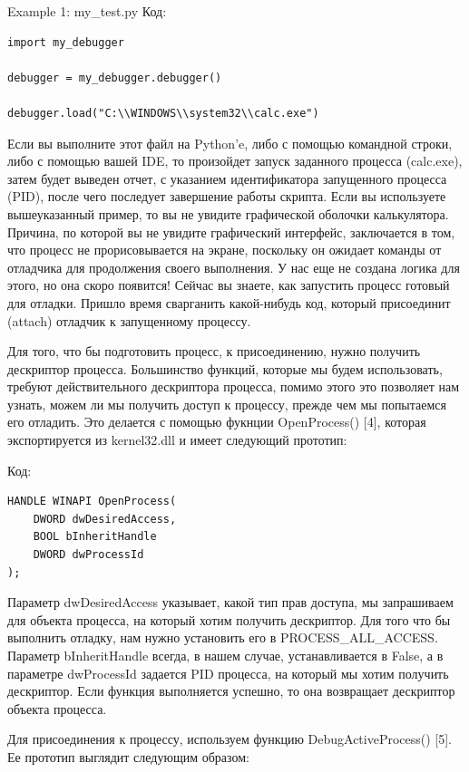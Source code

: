 \documentclass[12pt, a4paper, oneside]{book}
\begin{document}
Example 1: my\_test.py
Код:
\begin{verbatim}
import my_debugger

debugger = my_debugger.debugger()

debugger.load("C:\\WINDOWS\\system32\\calc.exe")
\end{verbatim}

Если вы выполните этот файл на Python’e, либо с помощью командной строки, либо с помощью вашей IDE, то произойдет запуск заданного процесса (calc.exe), затем будет выведен отчет, с указанием идентификатора запущенного процесса (PID), после чего последует завершение работы скрипта. Если вы используете вышеуказанный пример, то вы не увидите графической оболочки калькулятора. Причина, по которой вы не увидите графический интерфейс, заключается в том, что процесс не прорисовывается на экране, поскольку он ожидает команды от отладчика для продолжения своего выполнения. У нас еще не создана логика для этого, но она скоро появится! Сейчас вы знаете, как запустить процесс готовый для отладки. Пришло время сварганить какой-нибудь код, который присоединит (attach) отладчик к запущенному процессу.

Для того, что бы подготовить процесс, к присоединению, нужно получить дескриптор процесса. Большинство функций, которые мы будем использовать, требуют действительного дескриптора процесса, помимо этого это позволяет нам узнать, можем ли мы получить доступ к процессу, прежде чем мы попытаемся его отладить. Это делается с помощью фукнции OpenProcess() [4], которая экспортируется из kernel32.dll и имеет следующий прототип:

Код:
\begin{verbatim}
HANDLE WINAPI OpenProcess(
    DWORD dwDesiredAccess,
    BOOL bInheritHandle
    DWORD dwProcessId
);
\end{verbatim}

Параметр dwDesiredAccess указывает, какой тип прав доступа, мы запрашиваем для объекта процесса, на который хотим получить дескриптор. Для того что бы выполнить отладку, нам нужно установить его в PROCESS\_ALL\_ACCESS. Параметр bInheritHandle всегда, в нашем случае, устанавливается в False, а в параметре dwProcessId задается PID процесса, на который мы хотим получить дескриптор. Если функция выполняется успешно, то она возвращает дескриптор объекта процесса.

Для присоединения к процессу, используем функцию DebugActiveProcess() [5]. Ее прототип выглядит следующим образом:
\end{document}
